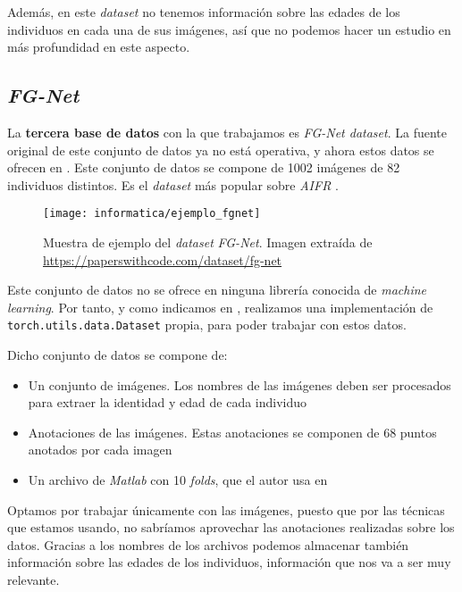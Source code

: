 Además, en este \textit{dataset} no tenemos información sobre las edades de los individuos en cada una de sus imágenes, así que no podemos hacer un estudio en más profundidad en este aspecto.

\subsection{\textit{FG-Net}} \label{isec:fgnet}

La \textbf{tercera base de datos} con la que trabajamos es \textit{FG-Net dataset}. La fuente original de este conjunto de datos ya no está operativa, y ahora estos datos se ofrecen en \cite{informatica:fgnet_dataset}. Este conjunto de datos se compone de 1002 imágenes de 82 individuos distintos. Es el \textit{dataset} más popular sobre \textit{AIFR} \cite{informatica:best_fgnet_model}.

\begin{figure}[H]
    \centering
    \texttt{[image: informatica/ejemplo\_fgnet]}
    \caption{Muestra de ejemplo del \textit{dataset} \textit{FG-Net}. Imagen extraída de \url{https://paperswithcode.com/dataset/fg-net}}
\end{figure}

Este conjunto de datos no se ofrece en ninguna librería conocida de \textit{machine learning}. Por tanto, y como indicamos en , realizamos una implementación de \lstinline{torch.utils.data.Dataset} propia, para poder trabajar con estos datos.

Dicho conjunto de datos se compone de:

\begin{itemize}
    \item Un conjunto de imágenes. Los nombres de las imágenes deben ser procesados para extraer la identidad y edad de cada individuo
    \item Anotaciones de las imágenes. Estas anotaciones se componen de 68 puntos anotados por cada imagen
    \item Un archivo de \textit{Matlab} con 10 \textit{folds}, que el autor usa en \cite{informatica:yanweifu_work}
\end{itemize}

Optamos por trabajar únicamente con las imágenes, puesto que por las técnicas que estamos usando, no sabríamos aprovechar las anotaciones realizadas sobre los datos. Gracias a los nombres de los archivos podemos almacenar también información sobre las edades de los individuos, información que nos va a ser muy relevante.

